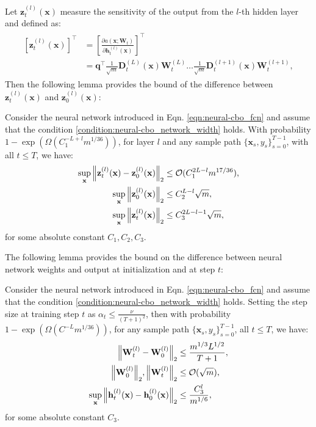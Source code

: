 Let $\mathbf{z}_t^{(l)} (\mathbf{x})$ measure the sensitivity of the output from the $l$-th hidden layer and defined as:
\begin{align*}
    \begin{split}
        [\mathbf{z}_t^{(l)}(\mathbf{x})]^\top &= \left [ \frac{\partial a(\mathbf{x}; \mathbf{W}_t)}{\partial \mathbf{h}_t^{(l)}(\mathbf{x})}\right]^\top \\
        &= \mathbf{q}^\top \frac{1}{\sqrt{m}} \mathbf{D}_t^{(L)}(\mathbf{x}) \mathbf{W}_t^{(L)} \dots \frac{1}{\sqrt{m}} \mathbf{D}_t^{(l+1)}(\mathbf{x}) \mathbf{W}_t^{(l+1)}, 
    \end{split} 
\end{align*}
Then the following lemma provides the bound of the difference between $\mathbf{z}_t^{(l)}(\mathbf{x})$ and $\mathbf{z}_0^{(l)}(\mathbf{x})$:
\begin{auxlemma}
\label{lemma:neural_cbo_nn_sensitivity_bound}
Consider the neural network introduced in Eqn. \eqref{eqn:neural-cbo_fcn} and assume that the condition \ref{condition:neural-cbo_network_width} holds. With probability $1 - \exp (\Omega( C_1^{-L+l} m^{1/36}))$, for layer $l$ and any sample path $\{ \mathbf{x}_s, y_s\}_{s=0}^{T-1}$, with all $t\le T$, we have:
\begin{align*}
    \sup_\mathbf{x} \norm{\mathbf{z}_t^{(l)}(\mathbf{x}) - \mathbf{z}_0^{(l)}(\mathbf{x})}_2 & \le \mathcal{O}(C_1^{2L-l} m^{17/36}), 
    \\
    \sup_\mathbf{x} \norm{\mathbf{z}_0^{(l)}(\mathbf{x})}_2 &  \le C_2^{L-l} \sqrt{m},
    \\
    \sup_\mathbf{x} \norm{\mathbf{z}_t^{(l)}(\mathbf{x})}_2 &  \le C_3^{2L-l-1} \sqrt{m},
\end{align*}
for some absolute constant $C_1, C_2, C_3$.
\end{auxlemma}



The following lemma provides the bound on the difference between neural network weights and output at initialization and at step $t$:

\begin{auxlemma}
\label{lemma:neural_cbo_weights_and_output_bounds}
Consider the neural network introduced in Eqn. \eqref{eqn:neural-cbo_fcn} and assume that the condition \ref{condition:neural-cbo_network_width} holds. Setting the step size at training step $t$ as $\alpha_t \le \frac{\nu}{(T+1)^2}$, then with probability $1 - \exp (\Omega( C^{-L} m^{1/36}))$, for any sample path $\{ \mathbf{x}_s, y_s\}_{s=0}^{T-1}$, all $t\le T$, we have:
\begin{align*}
    \norm{\mathbf{W}_t^{(l)} - \mathbf{W}_0^{(l)}}_2 & \le \frac{m^{1/3}L^{1/2}}{T+1},
 \\
    \norm{\mathbf{W}_0^{(l)}}_2, \norm{\mathbf{W}_t^{(l)}}_2 & \le \mathcal{O}(\sqrt{m}),
    \\
    \sup_\mathbf{x} \norm{\mathbf{h}_t^{(l)}(\mathbf{x}) - \mathbf{h}_0^{(l)}(\mathbf{x})}_2 & \le \frac{C_3^l}{m^{1/6}}, 
\end{align*}
for some absolute constant $C_3$.
\end{auxlemma}


